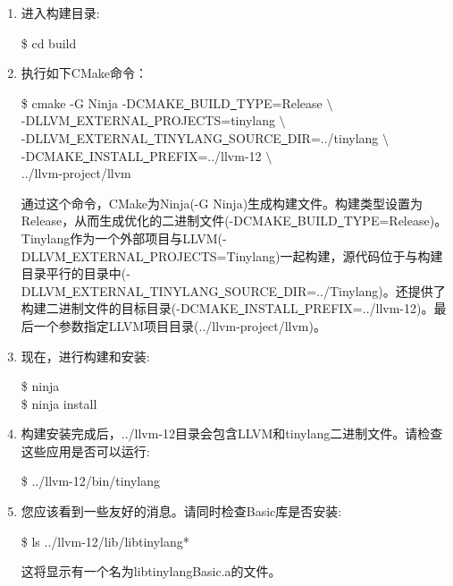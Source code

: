 \begin{enumerate}
\item 进入构建目录:
\begin{tcolorbox}[colback=white,colframe=black]
\$ cd build
\end{tcolorbox}

\item 执行如下CMake命令：
\begin{tcolorbox}[colback=white,colframe=black]
\$ cmake -G Ninja -DCMAKE\underline{~}BUILD\underline{~}TYPE=Release $\setminus$ \\
\hspace*{1cm}-DLLVM\underline{~}EXTERNAL\underline{~}PROJECTS=tinylang $\setminus$ \\
\hspace*{1cm}-DLLVM\underline{~}EXTERNAL\underline{~}TINYLANG\underline{~}SOURCE\underline{~}DIR=../tinylang $\setminus$ \\
\hspace*{1cm}-DCMAKE\underline{~}INSTALL\underline{~}PREFIX=../llvm-12 $\setminus$ \\
\hspace*{1cm}../llvm-project/llvm
\end{tcolorbox}
通过这个命令，CMake为Ninja(-G Ninja)生成构建文件。构建类型设置为Release，从而生成优化的二进制文件(-DCMAKE\underline{~}BUILD\underline{~}TYPE=Release)。Tinylang作为一个外部项目与LLVM(-DLLVM\underline{~}EXTERNAL\underline{~}PROJECTS=Tinylang)一起构建，源代码位于与构建目录平行的目录中(-DLLVM\underline{~}EXTERNAL\underline{~}TINYLANG\underline{~}SOURCE\underline{~}DIR=../Tinylang)。还提供了构建二进制文件的目标目录(-DCMAKE\underline{~}INSTALL\underline{~}PREFIX=../llvm-12)。最后一个参数指定LLVM项目目录(../llvm-project/llvm)。
	
\item 现在，进行构建和安装:
\begin{tcolorbox}[colback=white,colframe=black]
\$ ninja \\
\$ ninja install
\end{tcolorbox}

\item 构建安装完成后，../llvm-12目录会包含LLVM和tinylang二进制文件。请检查这些应用是否可以运行:
\begin{tcolorbox}[colback=white,colframe=black]
\$ ../llvm-12/bin/tinylang
\end{tcolorbox}

\item 您应该看到一些友好的消息。请同时检查Basic库是否安装:
\begin{tcolorbox}[colback=white,colframe=black]
	\$ ls ../llvm-12/lib/libtinylang*
\end{tcolorbox}
这将显示有一个名为libtinylangBasic.a的文件。

\end{enumerate}

